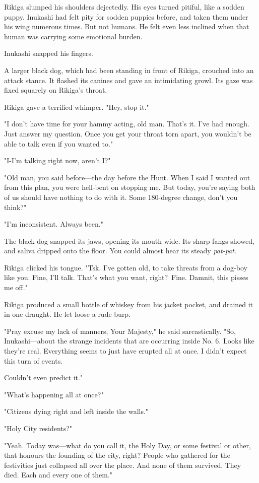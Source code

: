 Rikiga slumped his shoulders dejectedly. His eyes turned pitiful, like a
sodden puppy. Inukashi had felt pity for sodden puppies before, and
taken them under his wing numerous times. But not humans. He felt even
less inclined when that human was carrying some emotional burden.

Inukashi snapped his fingers.

A larger black dog, which had been standing in front of Rikiga, crouched
into an attack stance. It flashed its canines and gave an intimidating
growl. Its gaze was fixed squarely on Rikiga's throat.

Rikiga gave a terrified whimper. "Hey, stop it."

"I don't have time for your hammy acting, old man. That's it. I've had
enough. Just answer my question. Once you get your throat torn apart,
you wouldn't be able to talk even if you wanted to."

"I-I'm talking right now, aren't I?"

"Old man, you said before---the day before the Hunt. When I said I wanted
out from this plan, you were hell-bent on stopping me. But today, you're
saying both of us should have nothing to do with it. Some 180-degree
change, don't you think?"

"I'm inconsistent. Always been."

The black dog snapped its jaws, opening its mouth wide. Its sharp fangs
showed, and saliva dripped onto the floor. You could almost hear its
steady \emph{pat-pat}.

Rikiga clicked his tongue. "Tsk. I've gotten old, to take threats from a
dog-boy like you. Fine, I'll talk. That's what you want, right?~Fine.
Damnit, this pisses me off."

Rikiga produced a small bottle of whiskey from his jacket pocket, and
drained it in one draught. He let loose a rude burp.

"Pray excuse my lack of manners, Your Majesty," he said sarcastically.
"So, Inukashi---about the strange incidents that are occurring inside No.
6. Looks like they're real. Everything seems to just have erupted all at
once. I didn't expect this turn of events.~

Couldn't even predict it."

"What's happening all at once?"

"Citizens dying right and left inside the walls."

"Holy City residents?"

"Yeah. Today was---what do you call it, the Holy Day, or some festival or
other, that honours the founding of the city, right? People who gathered
for the festivities just collapsed all over the place. And none of them
survived. They died. Each and every one of them."

